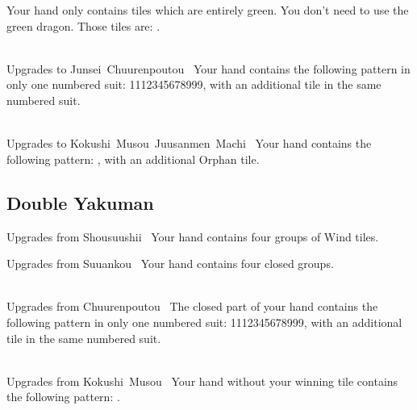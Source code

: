	{}
	{Your hand only contains tiles which are entirely green. You don't need to use the green dragon. Those tiles are: {}.}

	{\closedhand \\
	\upgradesto Upgrades to Junsei~Chuurenpoutou~}
	{Your hand contains the following pattern in only one numbered suit: 1112345678999, with an additional tile in the same numbered suit.}

	{\closedhand \\
	\upgradesto Upgrades to Kokushi~Musou~Juusanmen~Machi~}
	{Your hand contains the following pattern: {}, with an additional Orphan tile.}


\subsection{Double Yakuman}\label{core:ssec:double-yakuman-yaku}

	{\upgradesfrom Upgrades from Shousuushii~}
	{Your hand contains four groups of Wind tiles.}

	{\upgradesfrom Upgrades from Suuankou~}
	{Your hand contains four closed groups.}

	{\closedhand \\
	\upgradesfrom Upgrades from Chuurenpoutou~}
	{The closed part of your hand contains the following pattern in only one numbered suit: 1112345678999, with an additional tile in the same numbered suit.}

	{\closedhand \\
	\upgradesfrom Upgrades from Kokushi~Musou~}
	{Your hand without your winning tile contains the following pattern: {}.}